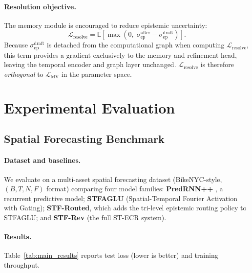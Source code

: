 \documentclass[11pt,a4paper]{article}
\newcommand{\sepd}{\sigma_{\mathrm{ep}}^{\mathrm{draft}}}
\newcommand{\sepa}{\sigma_{\mathrm{ep}}^{\mathrm{after}}}
\newcommand{\Lres}{\mathcal{L}_{\mathrm{resolve}}}
\begin{document}
\paragraph{Resolution objective.}
The memory module is encouraged to reduce epistemic uncertainty:
\begin{equation}
  \Lres = \mathbb{E}\!\left[\max(0,\; \sepa - \sepd)\right].
\label{eq:lresolve}
\end{equation}
Because $\sepd$ is detached from the computational graph when computing
$\Lres$, this term provides a gradient exclusively to the memory and
refinement head, leaving the temporal encoder and graph layer unchanged.
$\Lres$ is therefore \emph{orthogonal} to $\mathcal{L}_{\mathrm{MV}}$ in the
parameter space.

\section{Experimental Evaluation}
\label{sec:experiments}

\subsection{Spatial Forecasting Benchmark}
\label{sec:spatial_bench}

\paragraph{Dataset and baselines.}
We evaluate on a multi-asset spatial forecasting dataset (BikeNYC-style,
$(B, T, N, F)$ format) comparing four model families:
\textbf{PredRNN++} \citep{wang2018predrnn}, a recurrent predictive model;
\textbf{STFAGLU} (Spatial-Temporal Fourier Activation with Gating);
\textbf{STF-Routed}, which adds the tri-level epistemic routing policy to
STFAGLU; and \textbf{STF-Rev} (the full ST-ECR system).

\paragraph{Results.}
Table~\ref{tab:main_results} reports test loss (lower is better) and training
throughput.
\end{document}

